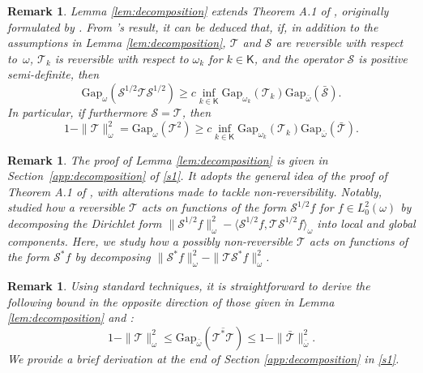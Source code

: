 \documentclass[12pt]{article}
\newcommand{\Mtk}{\mtkfont{T}}
\newcommand{\mtkfont}{\mathcal}
\newcommand{\pcite}[1]{\citeauthor{#1}'s \citeyearpar{#1}}
\newtheorem{remark}[theorem]{Remark}
\begin{document}
{
\begin{remark} \label{rem:madras}
	Lemma \ref{lem:decomposition} extends Theorem A.1 of \cite{madras2002markov}, originally formulated by \cite{caracciolo1992two}.
	From \pcite{caracciolo1992two} result, it can be deduced that, if, in addition to the assumptions in Lemma \ref{lem:decomposition}, $\Mtk$ and $\mtkfont{S}$ are reversible with respect to~$\omega$, $\Mtk_k$ is reversible with respect to $\omega_k$ for $k \in \mathsf{K}$, and the operator $\mtkfont{S}$ is positive semi-definite, then
	\[
	\mbox{Gap}_{\omega}(\mtkfont{S}^{1/2} \Mtk \mtkfont{S}^{1/2}) \geq c \inf_{k \in \mathsf{K}} \mbox{Gap}_{\omega_k}(\Mtk_k) \mbox{Gap}_{\bar{\omega}} (\bar{\mtkfont{S}}).
	\]
	In particular, if furthermore $\mtkfont{S} = \Mtk$, then
	\[
	1 - \|\Mtk\|_{\omega}^2 = \mbox{Gap}_{\omega}(\Mtk^2) \geq c \inf_{k \in \mathsf{K}} \mbox{Gap}_{\omega_k}(\Mtk_k) \mbox{Gap}_{\bar{\omega}} ( \bar{\Mtk} ).
	\]
\end{remark}

\begin{remark}
	The proof of Lemma \ref{lem:decomposition} is given in Section~\ref{app:decomposition} of \ref{s1}.
	It adopts the general idea of the proof of Theorem A.1 of \cite{madras2002markov}, with alterations made to tackle non-reversibility.
	Notably, \cite{madras2002markov} studied how a reversible $\Mtk$ acts on functions of the form $\mtkfont{S}^{1/2} f$ for $f \in L_0^2(\omega)$ by decomposing the Dirichlet form $\|\mtkfont{S}^{1/2}f\|_{\omega}^2 - \langle \mtkfont{S}^{1/2}f, \Mtk \mtkfont{S}^{1/2}f \rangle_{\omega}$ into local and global components.
	Here, we study how a possibly non-reversible $\Mtk$ acts on functions of the form $\mtkfont{S}^* f$ by decomposing $\|\mtkfont{S}^* f \|_{\omega}^2 - \|\Mtk \mtkfont{S}^* f\|_{\omega}^2$.
\end{remark}

\begin{remark} \label{rem:lower}
	Using standard techniques, it is straightforward to derive the following bound in the opposite direction of those given in Lemma \ref{lem:decomposition} and \cite{madras2002markov}:
	$$
	1 - \|\Mtk\|_{\omega}^2 \leq \mbox{Gap}_{\bar{\omega}}(\overline{\Mtk^* \Mtk}) \leq 1 - \|\bar{\mtkfont{T}}\|_{\bar{\omega}}^2.
	$$
	We provide a brief derivation at the end of Section \ref{app:decomposition} in \ref{s1}.
\end{remark}
}
\end{document}

